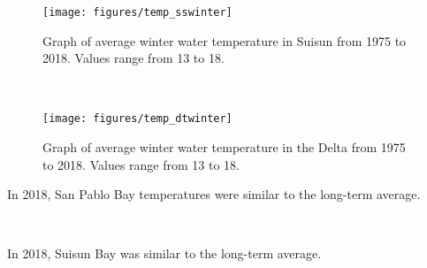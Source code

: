 \documentclass[
]{book}
\begin{document}
\begin{panel-grid}
\begin{columns-nocenter}
\begin{column800}

\begin{expand}

\begin{figure}
\texttt{[image: figures/temp\_sswinter]} \caption{Graph of average winter water temperature in Suisun from 1975 to 2018. Values range from 13 to 18.}\label{fig:unnamed-chunk-153}
\end{figure}

\end{expand}

\end{column800}

\begin{column40}

~

\end{column40}

\begin{column800}

\begin{expand}

\begin{figure}
\texttt{[image: figures/temp\_dtwinter]} \caption{Graph of average winter water temperature in the Delta from 1975 to 2018. Values range from 13 to 18.}\label{fig:unnamed-chunk-154}
\end{figure}

\end{expand}

\end{column800}

\end{columns-nocenter}

\begin{columns-nocenter}

\begin{column800}

In 2018, San Pablo Bay temperatures were similar to the long-term average.

\end{column800}

\begin{column40}

~

\end{column40}

\begin{column800}

In 2018, Suisun Bay was similar to the long-term average.


\end{column800}
\end{columns-nocenter}
\end{panel-grid}
\end{document}
